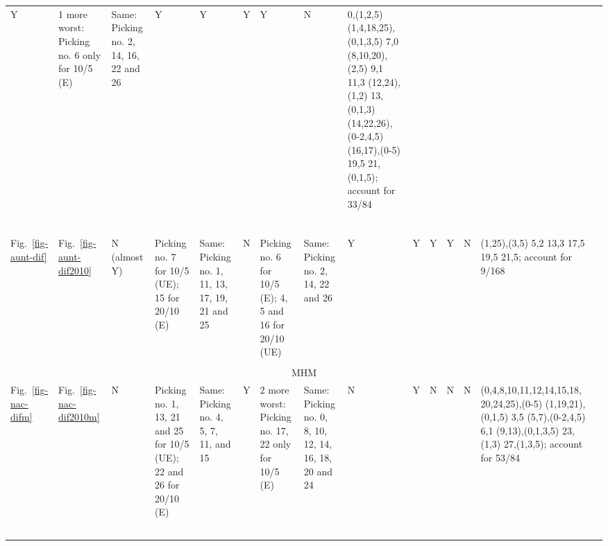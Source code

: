 \begin{table*}
{\begin{tabular}{l|l|l|l|p{2cm}|l|p{2.4cm}|l|lllllll}
  Y & \multirow{2}{*}{\parbox{2.4cm}{1 more worst: Picking no. 6 only for 10/5 (E)}} &
  \multirow{2}{*}{\parbox{2cm}{Same: Picking no. 2, 14, 16, 22 and 26}} &
  \multicolumn{1}{l|}{Y} & \multicolumn{1}{l|}{Y} & \multicolumn{1}{l|}{Y} &
  \multicolumn{1}{l|}{Y} & \multicolumn{1}{l|}{N} &
  \multicolumn{1}{l|}{\multirow{2}{*}{\parbox{3cm}{0,(1,2,5) (1,4,18,25),(0,1,3,5)
  7,0 (8,10,20),(2,5) 9,1 11,3 (12,24),(1,2) 13,(0,1,3) (14,22,26),(0-2,4,5)
  (16,17),(0-5) 19,5 21,(0,1,5); account for 33/84}}} &  \\ \\ \\ \\ \\ \\ \\ \\ \hline
Fig.~\ref{fig-aunt-dif} & Fig.~\ref{fig-aunt-dif2010} & \multirow{2}{*}{\parbox{1cm}{N (almost Y)}} &
  \multirow{2}{*}{\parbox{2.5cm}{Picking no. 7 for 10/5 (UE); 15 for 20/10 (E)}} &
  \multirow{2}{*}{\parbox{2cm}{Same: Picking no. 1, 11, 13, 17, 19, 21 and 25}} &
  N & \multirow{2}{*}{\parbox{2.4cm}{Picking no. 6 for 10/5 (E); 4, 5 and 16 for 20/10 (UE)}} &
  \multirow{2}{*}{\parbox{2cm}{Same: Picking no. 2, 14, 22 and 26}} &
  \multicolumn{1}{l|}{Y} & \multicolumn{1}{l|}{Y} & \multicolumn{1}{l|}{Y} &
  \multicolumn{1}{l|}{Y} & \multicolumn{1}{l|}{N} &
  \multicolumn{1}{l|}{\multirow{2}{*}{\parbox{3cm}{(1,25),(3,5) 5,2 13,3 17,5
  19,5 21,5; account for 9/168}}} &  \\ \\ \\ \hline
\multicolumn{15}{c}{MHM} \\ \hline
Fig.~\ref{fig-nac-difm} & Fig.~\ref{fig-nac-dif2010m} & N &
  \multirow{2}{*}{\parbox{2.5cm}{Picking no. 1, 13, 21 and 25 for 10/5 (UE);
  22 and 26 for 20/10 (E)}} &
  \multirow{2}{*}{\parbox{2cm}{Same: Picking no. 4, 5, 7, 11, and 15}} & Y &
  \multirow{2}{*}{\parbox{2.4cm}{2 more worst: Picking no. 17, 22 only for 10/5 (E)}} &
  \multirow{2}{*}{\parbox{2cm}{Same: Picking no. 0, 8, 10, 12, 14, 16, 18, 20 and 24}} &
  \multicolumn{1}{l|}{N} & \multicolumn{1}{l|}{Y} & \multicolumn{1}{l|}{N} &
  \multicolumn{1}{l|}{N} & \multicolumn{1}{l|}{N} &
  \multicolumn{1}{l|}{\multirow{2}{*}{\parbox{3cm}{(0,4,8,10,11,12,14,15,18, 20,24,25),(0-5)
  (1,19,21),(0,1,5) 3,5 (5,7),(0-2,4,5) 6,1 (9,13),(0,1,3,5) 23,(1,3)
  27,(1,3,5); account for 53/84}}} &
  \\ \\ \\ \\ \\ \\ \\ \hline

\end{tabular}}
\end{table*}
